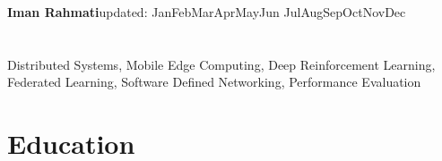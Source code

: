 \documentclass[11pt]{article}
\makeatletter
\newcommand*{\eduWithDetail}[5]
{\begin{table}[h!]
	\begin{tabular*}{\textwidth}{ll@{\extracolsep{\fill}}r}
		\textbf{#1} &  #2 & \\ %
		#3 &  & \\
		\multicolumn{3}{l}{#5}
	\end{tabular*}
\end{table}}
\newcommand*{\multilineCell}[1]
{\begin{tabular}[c]{@{}l@{}} #1
\end{tabular}}
\def\today{\number\day \space \ifcase\month\or
	Jan\or Feb\or Mar\or Apr\or May\or Jun\or
	Jul\or Aug\or Sep\or Oct\or Nov\or Dec\fi
	\space \number\year}
\makeatother
\begin{document}
%         
{\noindent \huge\bfseries Iman Rahmati}\hfill{\footnotesize updated: \today}
\vspace{-1cm}
\section{}
 \vspace{-2mm}

 Distributed Systems, Mobile Edge Computing, Deep Reinforcement Learning, Federated Learning, Software Defined Networking, Performance Evaluation
\vspace{-2mm}
\section{Education}



\vspace{-5mm}
\end{document}
